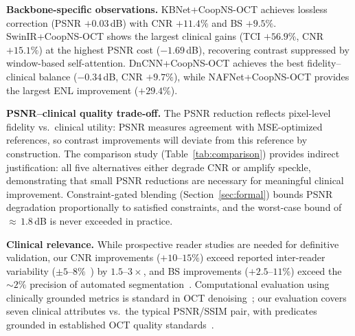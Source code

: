 \documentclass[journal,twoside,web]{ieeecolor}
\begin{document}
\textbf{Backbone-specific observations.} KBNet+CoopNS-OCT achieves lossless correction (PSNR $+0.03$\,dB) with CNR $+11.4\%$ and BS $+9.5\%$. SwinIR+CoopNS-OCT shows the largest clinical gains (TCI $+56.9\%$, CNR $+15.1\%$) at the highest PSNR cost ($-1.69$\,dB), recovering contrast suppressed by window-based self-attention. DnCNN+CoopNS-OCT achieves the best fidelity--clinical balance ($-0.34$\,dB, CNR $+9.7\%$), while NAFNet+CoopNS-OCT provides the largest ENL improvement ($+29.4\%$).

\textbf{PSNR--clinical quality trade-off.} The PSNR reduction reflects pixel-level fidelity vs.\ clinical utility: PSNR measures agreement with MSE-optimized references, so contrast improvements will deviate from this reference by construction. The comparison study (Table~\ref{tab:comparison}) provides indirect justification: all five alternatives either degrade CNR or amplify speckle, demonstrating that small PSNR reductions are necessary for meaningful clinical improvement. Constraint-gated blending (Section~\ref{sec:formal}) bounds PSNR degradation proportionally to satisfied constraints, and the worst-case bound of ${\approx}\,1.8$\,dB is never exceeded in practice.

\textbf{Clinical relevance.} While prospective reader studies are needed for definitive validation, our CNR improvements ($+10$--$15\%$) exceed reported inter-reader variability ($\pm 5$--$8\%$~\cite{stein2006quality}) by $1.5$--$3{\times}$, and BS improvements ($+2.5$--$11\%$) exceed the ${\sim}2\%$ precision of automated segmentation~\cite{devalla2018drunet}. Computational evaluation using clinically grounded metrics is standard in OCT denoising~\cite{geng2022triplet,fang2012sparsity,mayer2012wavelet}; our evaluation covers seven clinical attributes vs.\ the typical PSNR/SSIM pair, with predicates grounded in established OCT quality standards~\cite{stein2006quality,tewarie2012oscar}.
\end{document}
